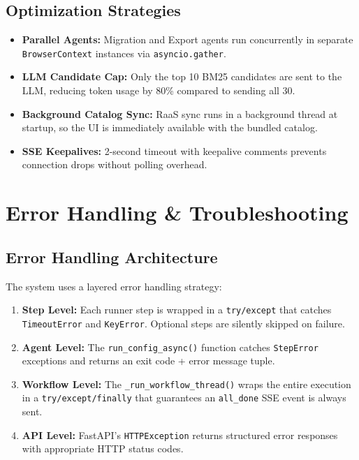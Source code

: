 \documentclass[12pt,a4paper]{article}
\begin{document}
\subsection{Optimization Strategies}
\label{subsec:optimizations}

\begin{itemize}[leftmargin=2em]
  \item \textbf{Parallel Agents:} Migration and Export agents run concurrently in separate \texttt{BrowserContext} instances via \texttt{asyncio.gather}.
  \item \textbf{LLM Candidate Cap:} Only the top 10 BM25 candidates are sent to the LLM, reducing token usage by 80\% compared to sending all 30.
  \item \textbf{Background Catalog Sync:} RaaS sync runs in a background thread at startup, so the UI is immediately available with the bundled catalog.
  \item \textbf{SSE Keepalives:} 2-second timeout with keepalive comments prevents connection drops without polling overhead.
\end{itemize}

\section{Error Handling \& Troubleshooting}
\label{sec:troubleshooting}

\subsection{Error Handling Architecture}
\label{subsec:error-architecture}

The system uses a layered error handling strategy:

\begin{enumerate}[leftmargin=2em]
  \item \textbf{Step Level:} Each runner step is wrapped in a \texttt{try/except} that catches \texttt{TimeoutError} and \texttt{KeyError}. Optional steps are silently skipped on failure.
  \item \textbf{Agent Level:} The \texttt{run\_config\_async()} function catches \texttt{StepError} exceptions and returns an exit code + error message tuple.
  \item \textbf{Workflow Level:} The \texttt{\_run\_workflow\_thread()} wraps the entire execution in a \texttt{try/except/finally} that guarantees an \texttt{all\_done} SSE event is always sent.
  \item \textbf{API Level:} FastAPI's \texttt{HTTPException} returns structured error responses with appropriate HTTP status codes.
\end{enumerate}
\end{document}
